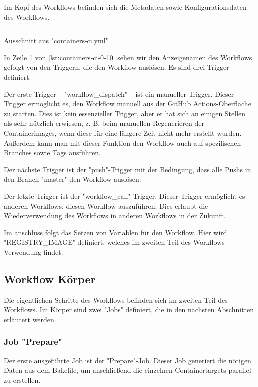 Im Kopf des Workflows befinden sich die Metadaten sowie Konfigurationsdaten des Workflows.

\begin{listing}[H]
    \inputminted[firstline=0,lastline=10]{yaml}{./code-examples/containers-ci.yml}
    \caption{Ausschnitt aus "containers-ci.yml"}
    \label{lst:containers-ci-0-10}
\end{listing}

In Zeile 1 von \cref{lst:containers-ci-0-10} sehen wir den Anzeigenamen des Workflows, gefolgt von den Triggern, die den Workflow auslösen. Es sind drei Trigger definiert.

Der erste Trigger – "workflow\_dispatch" – ist ein manueller Trigger. Dieser Trigger ermöglicht es, den Workflow manuell aus der GitHub Actions-Oberfläche zu starten. Dies ist kein essenzieller Trigger, aber er hat sich an einigen Stellen als sehr nützlich erwiesen, z. B. beim manuellen Regenerieren der Containerimages, wenn diese für eine längere Zeit nicht mehr erstellt wurden. Außerdem kann man mit dieser Funktion den Workflow auch auf spezifischen Branches sowie Tags ausführen.

Der nächste Trigger ist der "push"-Trigger mit der Bedingung, dass alle Pushs in den Branch "master" den Workflow auslösen.

Der letzte Trigger ist der "workflow\_call"-Trigger. Dieser Trigger ermöglicht es anderen Workflows, diesen Workflow auszuführen. Dies erlaubt die Wiederverwendung des Workflows in anderen Workflows in der Zukunft.

Im anschluss folgt das Setzen von Variablen für den Workflow. Hier wird "REGISTRY\_IMAGE" definiert, welches im zweiten Teil des Workflows Verwendung findet.

\subsection{Workflow Körper}

Die eigentlichen Schritte des Workflows befinden sich im zweiten Teil des Workflows. Im Körper sind zwei "Jobs" definiert, die in den nächsten Abschnitten erläutert werden.

\subsubsection{Job "Prepare"} \label{ssec:job-prepare}

Der erste ausgeführte Job ist der "Prepare"-Job. Dieser Job generiert die nötigen Daten aus dem Bakefile, um anschließend die einzelnen Containertargets parallel zu erstellen.

